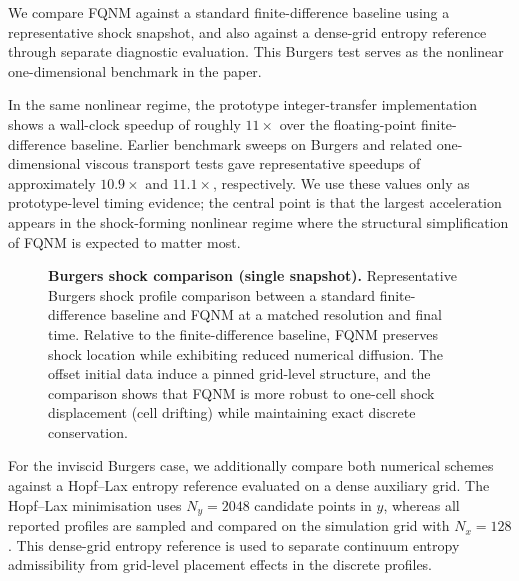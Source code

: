 \documentclass[sn-basic]{sn-jnl}
\theoremstyle{plain}
\theoremstyle{remark}
\begin{document}
We compare FQNM against a standard finite-difference baseline using a representative shock snapshot, and also against a dense-grid entropy reference through separate diagnostic evaluation. This Burgers test serves as the nonlinear one-dimensional benchmark in the paper.

In the same nonlinear regime, the prototype integer-transfer implementation shows a wall-clock speedup of roughly \(11\times\) over the floating-point finite-difference baseline. Earlier benchmark sweeps on Burgers and related one-dimensional viscous transport tests gave representative speedups of approximately \(10.9\times\) and \(11.1\times\), respectively. We use these values only as prototype-level timing evidence; the central point is that the largest acceleration appears in the shock-forming nonlinear regime where the structural simplification of FQNM is expected to matter most.

\begin{figure}[t]
\centering
{}
\caption{\textbf{Burgers shock comparison (single snapshot).} Representative Burgers shock profile comparison between a standard finite-difference baseline and FQNM at a matched resolution and final time. Relative to the finite-difference baseline, FQNM preserves shock location while exhibiting reduced numerical diffusion. The offset initial data induce a pinned grid-level structure, and the comparison shows that FQNM is more robust to one-cell shock displacement (cell drifting) while maintaining exact discrete conservation.}
\label{fig:burgers_shock_zoom}
\end{figure}



For the inviscid Burgers case, we additionally compare both numerical schemes against a Hopf--Lax entropy reference evaluated on a dense auxiliary grid. The Hopf--Lax minimisation uses $N_y = 2048$ candidate points in $y$, whereas all reported profiles are sampled and compared on the simulation grid with $N_x = 128$. This dense-grid entropy reference is used to separate continuum entropy admissibility from grid-level placement effects in the discrete profiles.
\end{document}
